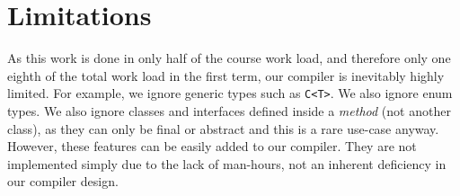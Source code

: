 \documentclass[twocolumn]{article}
\begin{document}
\section{Limitations}
As this work is done in only half of the course work load, and therefore only one eighth of the
total work load in the first term, our compiler is inevitably highly limited.
For example, we ignore generic types such as \verb|C<T>|. We also ignore enum types. We also ignore classes and interfaces defined inside a \emph{method} (not another class), as they can only be final or abstract and this is a rare use-case anyway. However, these features can be easily added to our compiler. They are not implemented simply due to the lack of man-hours, not an inherent deficiency in our compiler design.

\begin{thebibliography}{9}
\end{thebibliography}
\end{document}
